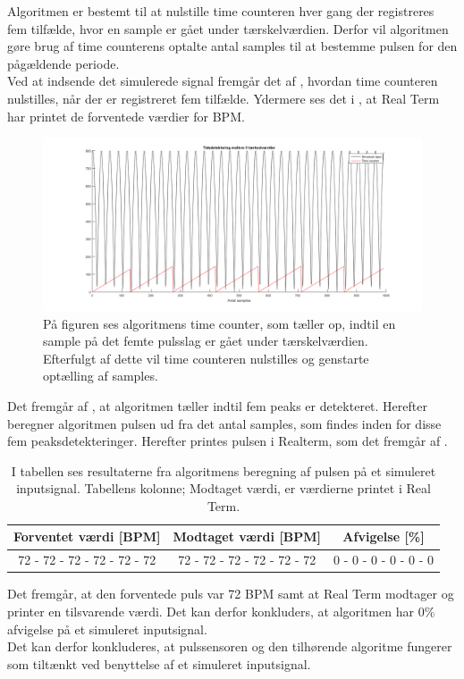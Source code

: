 Algoritmen er bestemt til at nulstille time counteren hver gang der registreres fem tilfælde, hvor en sample er gået under tærskelværdien. Derfor vil algoritmen gøre brug af time counterens optalte antal samples til at bestemme pulsen for den pågældende periode. \\
Ved at indsende det simulerede signal fremgår det af , hvordan time counteren nulstilles, når der er registreret fem tilfælde. Ydermere ses det i , at Real Term har printet de forventede værdier for BPM.
\begin{figure}[H]
	\centering
	\includegraphics[scale=0.4]{figures/cDesign/timecounter_puls_pic.png}
	\caption{På figuren ses algoritmens time counter, som tæller op, indtil en sample på det femte pulsslag er gået under tærskelværdien. Efterfulgt af dette vil time counteren nulstilles og genstarte optælling af samples.}
	\label{fig:timecounter_puls_realterm}
\end{figure}

Det fremgår af , at algoritmen tæller indtil fem peaks er detekteret. Herefter beregner algoritmen pulsen ud fra det antal samples, som findes inden for disse fem peaksdetekteringer. Herefter printes pulsen i Realterm, som det fremgår af .
\begin{table}[H]
	\centering
	\begin{tabular}{ccc}
		\hline
		\rowcolor[HTML]{C0C0C0} 
		Forventet værdi [BPM] & Modtaget værdi [BPM] & Afvigelse [\%]\\ \hline
		72 - 72 - 72 - 72 - 72 - 72         & 72 - 72 - 72 - 72 - 72 - 72         & 0 - 0 - 0 - 0 - 0 - 0 \\ \hline
	\end{tabular}
	\caption{I tabellen ses resultaterne fra algoritmens beregning af pulsen på et simuleret inputsignal. Tabellens kolonne; Modtaget værdi, er værdierne printet i Real Term.}
	\label{tab:test_puls_realterm}
\end{table} \vspace{-0.5cm}
Det fremgår, at den forventede puls var 72 BPM samt at Real Term modtager og printer en tilsvarende værdi. Det kan derfor konkluders, at algoritmen har 0\% afvigelse på et simuleret inputsignal. \\
Det kan derfor konkluderes, at pulssensoren og den tilhørende algoritme fungerer som tiltænkt ved benyttelse af et simuleret inputsignal. 

